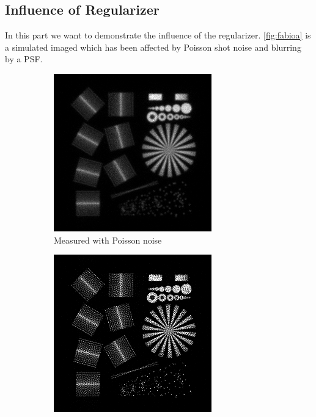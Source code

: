 \documentclass{juliacon}
\begin{document}
    \subsection{Influence of Regularizer}
        In this part we want to demonstrate the influence of the regularizer.
        \autoref{fig:fabioa} is a simulated imaged which has been affected by Poisson shot noise and blurring by a PSF.
        \begin{figure}[h]
            \begin{subfigure}[b]{.25\textwidth}
                \centering
                \includegraphics[width=0.75\textwidth]{figures/resolution_test_chart_blurry.png}
                \caption{Measured with Poisson noise}
                \label{fig:fabioa}
            \end{subfigure}%
            \hfill
            \begin{subfigure}[b]{.25\textwidth}
                \centering
                \includegraphics[width=0.75\textwidth]{figures/resolution_test_chart_no_reg_iter_50.png}

\end{subfigure}
\end{figure}
\end{document}
